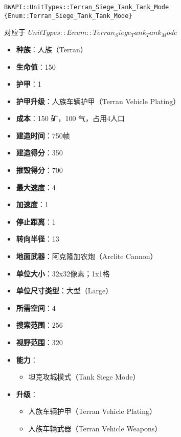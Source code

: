 \begin{tcolorbox}[colback=white, colframe=black!60!white, title=Terran\_Siege\_Tank\_Tank\_Mode(), arc=0mm]
    \begin{verbatim}
BWAPI::UnitTypes::Terran_Siege_Tank_Tank_Mode {Enum::Terran_Siege_Tank_Tank_Mode}
    \end{verbatim}
    对应于  $ UnitTypes::Enum::Terran_Siege_Tank_Tank_Mode $ 
    
    \begin{itemize}
        \item \textbf{种族}：人族（Terran）
        \item \textbf{生命值}：150
        \item \textbf{护甲}：1
        \item \textbf{护甲升级}：人族车辆护甲（Terran Vehicle Plating）
        \item \textbf{成本}：150 矿，100 气，占用4人口
        \item \textbf{建造时间}：750帧
        \item \textbf{建造得分}：350
        \item \textbf{摧毁得分}：700
        \item \textbf{最大速度}：4
        \item \textbf{加速度}：1
        \item \textbf{停止距离}：1
        \item \textbf{转向半径}：13
        \item \textbf{地面武器}：阿克隆加农炮（Arclite Cannon）
        \item \textbf{单位大小}：32x32像素；1x1格
        \item \textbf{单位尺寸类型}：大型（Large）
        \item \textbf{所需空间}：4
        \item \textbf{搜索范围}：256
        \item \textbf{视野范围}：320
        \item \textbf{能力}：
            \begin{itemize}
                \item 坦克攻城模式（Tank Siege Mode）
            \end{itemize}
        \item \textbf{升级}：
            \begin{itemize}
                \item 人族车辆护甲（Terran Vehicle Plating）
                \item 人族车辆武器（Terran Vehicle Weapons）

\end{itemize}
\end{itemize}
\end{tcolorbox}
